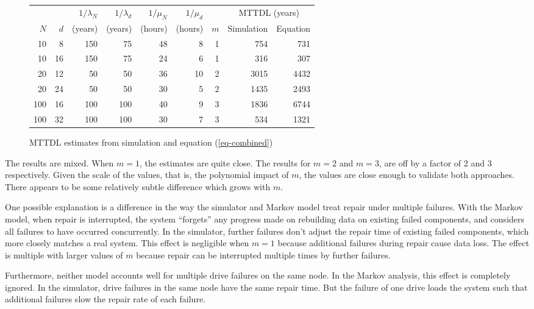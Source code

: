 \documentclass[11pt]{article}
\numberwithin{equation}{section}
\begin{document}
\begin{figure}[h]
\begin{center}
\begin{tabular}{|rrrrrrr|r|r|}
\hline
& & $1/\lambda_{N}$ & $1/\lambda_{d}$ & $1/\mu_{N}$ & $1/\mu_{d}$ &  & 
\multicolumn{2}{c|}{MTTDL (years)}
\\
$N$ & $d$ & (years) & (years) & (hours) & (hours) & $m$ &
Simulation & Equation 
\\
\hline
10 & 8  & 150 & 75 & 48 & 8 &  1 & 754 &  731 
\\
\hline
10 & 16 & 150 & 75 & 24 & 6 &  1 & 316 & 307
\\
\hline
20 & 12 & 50 & 50  &  36 & 10 &  2 &  3015 & 4432 
\\
\hline
20 & 24 & 50 & 50  & 30 & 5 &  2 &  1435 & 2493  
\\
\hline
100 & 16 & 100 & 100 & 40  & 9  &  3 & 1836 & 6744
\\
\hline
100 & 32 & 100 & 100 & 30  & 7 &  3 & 534 & 1321 
\\
\hline
\end{tabular}
\end{center}
\caption{MTTDL estimates from simulation and equation (\ref{eq-combined})}
\label{fig-results}
\end{figure}

The results are mixed.  When $m=1$, the estimates are quite close.  The
results for $m=2$ and $m=3$, are off by a factor of 2 and 3 respectively.
Given the scale of the values, that is, the polynomial impact of $m$, the
values are close enough to validate both approaches.  There appears to be some
relatively subtle difference which grows with $m$.

One possible explanation is a difference in the way the simulator and Markov
model treat repair under multiple failures.  With the Markov model, when
repair is interrupted, the system ``forgets'' any progress made on rebuilding
data on existing failed components, and considers all failures to have
occurred concurrently.  In the simulator, further failures don't adjust the
repair time of existing failed components, which more closely matches a real
system.  This effect is negligible when $m=1$ because additional failures
during repair cause data loss.  The effect is multiple with larger values of
$m$ because repair can be interrupted multiple times by further failures.

Furthermore, neither model accounts well for multiple drive failures on the
same node.  In the Markov analysis, this effect is completely ignored.  In the
simulator, drive failures in the same node have the same repair time.  But
the failure of one drive loads the system such that additional failures slow
the repair rate of each failure.
\end{document}
